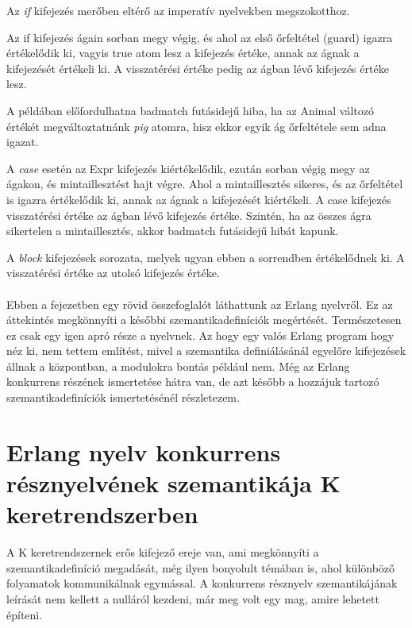 \documentclass[twoside, a4paper, 12pt]{article}
\begin{document}
Az \textit{if} kifejezés merőben eltérő az imperatív nyelvekben megszokotthoz.



Az if kifejezés ágain sorban megy végig, és ahol az első őrfeltétel (guard) igazra értékelődik ki, vagyis true atom lesz a kifejezés értéke, annak az ágnak a kifejezését értékeli ki. A visszatérési értéke pedig az ágban lévő kifejezés értéke lesz.



A példában előfordulhatna badmatch futásidejű hiba, ha az Animal változó értékét megváltoztatnánk \textit{pig} atomra, hisz ekkor egyik ág őrfeltétele sem adna igazat.



A \textit{case} esetén az Expr kifejezés kiértékelődik, ezután sorban végig megy az ágakon, és mintaillesztést hajt végre. Ahol a mintaillesztés sikeres, és az őrfeltétel is igazra értékelődik ki, annak az ágnak a kifejezését kiértékeli. A case kifejezés visszatérési értéke az ágban lévő kifejezés értéke. Szintén, ha az összes ágra sikertelen a mintaillesztés, akkor badmatch futásidejű hibát kapunk.



A \textit{block} kifejezések sorozata, melyek ugyan ebben a sorrendben értékelődnek ki. A visszatérési értéke az utolsó kifejezés értéke.

\paragraph{}
Ebben a fejezetben egy rövid összefoglalót láthattunk az Erlang nyelvről. Ez az áttekintés megkönnyíti a későbbi szemantikadefiníciók megértését. Természetesen ez csak egy igen apró része a nyelvnek. Az hogy egy valós Erlang program hogy néz ki, nem tettem említést, mivel a szemantika definiálásánál egyelőre kifejezések állnak a központban, a modulokra bontás például nem. Még az Erlang konkurrens részének ismertetése hátra van, de azt később a hozzájuk tartozó szemantikadefiníciók ismertetésénél részletezem.

\section{Erlang nyelv konkurrens résznyelvének szemantikája K keretrendszerben}
A K keretrendszernek erős kifejező ereje van, ami megkönnyíti a szemantikadefiníció megadását, még ilyen bonyolult témában is, ahol különböző folyamatok kommunikálnak egymással. A konkurrens résznyelv szemantikájának leírását nem kellett a nulláról kezdeni, már meg volt egy mag, amire lehetett építeni.
\end{document}
